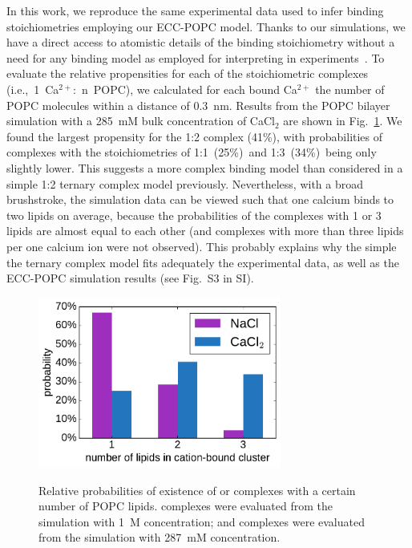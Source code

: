\documentclass[journal=jpcbfk,manuscript=article]{achemso}
\begin{document}
In this work, we reproduce the same experimental data used to infer binding stoichiometries employing our ECC-POPC model. Thanks to our simulations, we have a direct access to atomistic details of the binding stoichiometry without a need for any binding model as employed for interpreting in experiments~\cite{altenbach84, macdonald87}. To evaluate the relative propensities for each of the stoichiometric complexes (i.e.,~1~Ca$^{2+}$:~n~POPC), we calculated for each bound Ca$^{2+}$ the number of POPC molecules within a distance of 0.3~nm.
Results from the POPC bilayer simulation with a 285~mM bulk concentration of CaCl$_2$ are shown in Fig.~\ref{fig:cacl_complexes}.
We found the largest propensity for the 1:2 complex (41\%), with probabilities of complexes with the stoichiometries of 1:1~(25\%)~and 1:3~(34\%)~being only slightly lower. This suggests a more complex binding model than considered in a simple 1:2 ternary complex model previously. Nevertheless, with a broad brushstroke, the simulation data can be viewed such that one calcium binds to two lipids on average, because the probabilities of the complexes with 1 or 3 lipids are almost equal to each other  (and complexes with more than three lipids per one calcium ion were not observed). This probably explains why the simple the ternary complex model fits adequately the experimental data, as well as the ECC-POPC simulation results (see Fig.~S3 in SI).

\begin{figure}[tb!]
  \centering
  \includegraphics[width=8.0cm]{../Fig/ipython_nb/stoichiometry_NaCl-CaCl2_comparison_Ecc-lipids.pdf} \\
  \caption{\label{fig:cacl_complexes}
      Relative probabilities of existence of  or  complexes
      with a certain number of POPC lipids. 
       complexes were evaluated from the simulation with 1~M concentration;
      and  complexes were evaluated from the simulation with 287~mM concentration.
  }
\end{figure}
\end{document}
